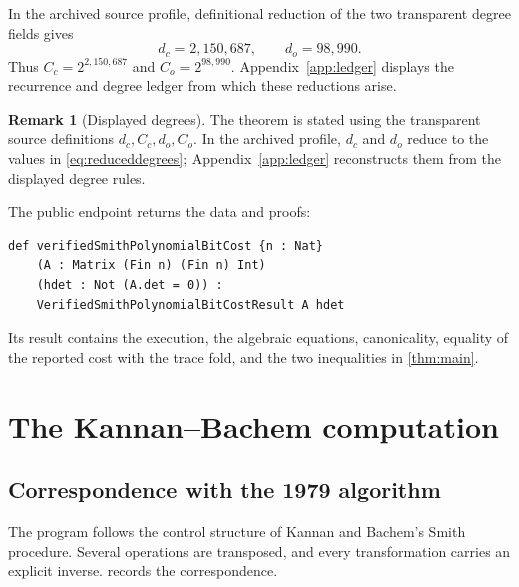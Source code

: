 \documentclass[11pt]{article}
\theoremstyle{definition}
\newtheorem{remark}[theorem]{Remark}
\begin{document}
In the archived source profile, definitional reduction of the two transparent degree fields gives
\begin{equation}
 d_c=2{,}150{,}687,
 \qquad
 d_o=98{,}990.
 \label{eq:reduceddegrees}
\end{equation}
Thus $C_c=2^{2{,}150{,}687}$ and $C_o=2^{98{,}990}$.  Appendix~\ref{app:ledger} displays the recurrence and degree ledger from which these reductions arise.

\begin{remark}[Displayed degrees]
The theorem is stated using the transparent source definitions $d_c,C_c,d_o,C_o$.  In the archived profile, $d_c$ and $d_o$ reduce to the values in \eqref{eq:reduceddegrees}; Appendix~\ref{app:ledger} reconstructs them from the displayed degree rules.
\end{remark}

The public endpoint returns the data and proofs:
\begin{lstlisting}
def verifiedSmithPolynomialBitCost {n : Nat}
    (A : Matrix (Fin n) (Fin n) Int)
    (hdet : Not (A.det = 0)) :
    VerifiedSmithPolynomialBitCostResult A hdet
\end{lstlisting}
Its result contains the execution, the algebraic equations, canonicality, equality of the reported cost with the trace fold, and the two inequalities in \cref{thm:main}.

\section{The Kannan--Bachem computation}
\label{sec:algorithm}

\subsection{Correspondence with the 1979 algorithm}

The program follows the control structure of Kannan and Bachem's Smith procedure.  Several operations are transposed, and every transformation carries an explicit inverse.   records the correspondence.
\end{document}
